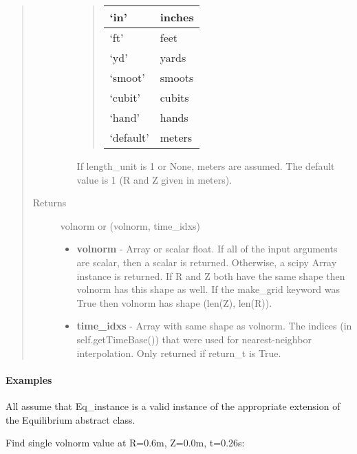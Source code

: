 \documentclass[letterpaper,10pt,english]{sphinxmanual}
\begin{document}
\begin{fulllineitems}
\begin{fulllineitems}
\begin{quote}
\begin{description}
\begin{itemize}
\begin{quote}
\begin{tabulary}{\linewidth}{|L|L|}
`in'
 & 
inches
\\\hline

`ft'
 & 
feet
\\\hline

`yd'
 & 
yards
\\\hline

`smoot'
 & 
smoots
\\\hline

`cubit'
 & 
cubits
\\\hline

`hand'
 & 
hands
\\\hline

`default'
 & 
meters
\\\hline
\end{tabulary}

\end{quote}

If length\_unit is 1 or None, meters are assumed. The default
value is 1 (R and Z given in meters).

\end{itemize}

\item[{Returns}] \leavevmode

volnorm or (volnorm, time\_idxs)
\begin{itemize}
\item {} 
\textbf{volnorm} - Array or scalar float. If all of the input arguments are
scalar, then a scalar is returned. Otherwise, a scipy Array
instance is returned. If R and Z both have the same shape then
volnorm has this shape as well. If the make\_grid keyword was
True then volnorm has shape (len(Z), len(R)).

\item {} 
\textbf{time\_idxs} - Array with same shape as volnorm. The indices (in
self.getTimeBase()) that were used for nearest-neighbor
interpolation. Only returned if return\_t is True.

\end{itemize}


\end{description}\end{quote}
\paragraph{Examples}

All assume that Eq\_instance is a valid instance of the appropriate
extension of the Equilibrium abstract class.

Find single volnorm value at R=0.6m, Z=0.0m, t=0.26s:


\end{fulllineitems}
\end{fulllineitems}
\end{document}
